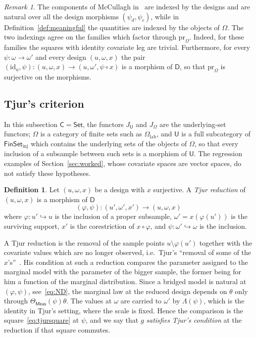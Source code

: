 \documentclass[11pt,a4paper]{article}
\theoremstyle{plain}
\theoremstyle{definition}
\newtheorem{definition}[theorem]{Definition}
\theoremstyle{remark}
\newtheorem{remark}[theorem]{Remark}
\newcommand{\cat}[1]{\mathsf{#1}}
\newcommand{\catU}{\cat{U}}
\newcommand{\catO}{\cat{\Omega}}
\newcommand{\catD}{\cat{D}}
\newcommand{\Meas}{\cat{Meas}}
\newcommand{\Set}{\cat{Set}}
\newcommand{\FinSet}{\cat{FinSet}}
\newcommand{\id}{\mathrm{id}}
\newcommand{\pr}{\mathrm{pr}}
\begin{document}
\begin{remark}\label{rem:indexings}
The components of McCullagh in~\cite[\S4.5]{mccullagh_what_2002} are indexed
by the designs and are natural over all the design morphisms
$(\psi_{d},\psi_{c})$, while in Definition~\ref{def:meaningful} the quantities
are indexed by the objects of $\catO$. The two indexings agree on the families
which factor through $\pr_{\catO}$. Indeed, for these families the squares with
identity covariate leg are trivial. Furthermore, for every
$\psi \colon \omega \to \omega'$ and every design $(u,\omega,x)$ the pair
$(\id_{u},\psi) \colon (u,\omega,x) \to (u,\omega',\psi\circ x)$ is a morphism
of $\catD$, so that $\pr_{\catO}$ is surjective on the morphisms.
\end{remark}

\subsection{Tjur's criterion}\label{sec:tjur}

In this subsection $\cat{C} = \Set$, the functors $J_{\catU}$ and $J_{\catO}$
are the underlying-set functors; $\catO$ is a category of finite sets such as
$\catO_{\mathrm{lab}}$, and $\catU$ is a full subcategory of
$\FinSet_{\mathrm{inj}}$ which contains the underlying sets of the objects of
$\catO$, so that every inclusion of a subsample between such sets is a
morphism of $\catU$. The regression examples of Section~\ref{sec:worked},
whose covariate spaces are vector spaces, do not satisfy these hypotheses.

\begin{definition}\label{def:tjurreduction}
Let $(u,\omega,x)$ be a design with $x$ surjective. A \emph{Tjur reduction} of
$(u,\omega,x)$ is a morphism of $\catD$
\[
(\varphi,\psi) \colon (u',\omega',x') \longrightarrow (u,\omega,x)
\]
where $\varphi \colon u' \hookrightarrow u$ is the inclusion of a proper
subsample, $\omega' = x(\varphi(u'))$ is the surviving support, $x'$ is the
corestriction of $x \circ \varphi$, and
$\psi \colon \omega' \hookrightarrow \omega$ is the inclusion.
\end{definition}

A Tjur reduction is the removal of the sample points
$u \setminus \varphi(u')$ together with the covariate values which are no
longer observed, i.e.\ Tjur's ``removal of some of the
$x$'s''~\cite[p.~1299]{tjur_discussion_2002}. His condition at such a
reduction compares the parameter assigned to the marginal model with the
parameter of the bigger sample, the former being for him a function of the
marginal distribution. Since a bridged model is natural at $(\varphi,\psi)$,
see~\eqref{eq:ND}, the marginal law at the reduced design depends on $\theta$
only through $\Theta_\Meas(\psi)\theta$. The values at $\omega$ are carried to
$\omega'$ by $\Lambda(\psi)$, which is the identity in Tjur's setting, where
the scale is fixed. Hence the comparison is the square~\eqref{eq:tjursquare}
at $\psi$, and we say that $g$ \emph{satisfies Tjur's condition} at the
reduction if that square commutes.
\end{document}
